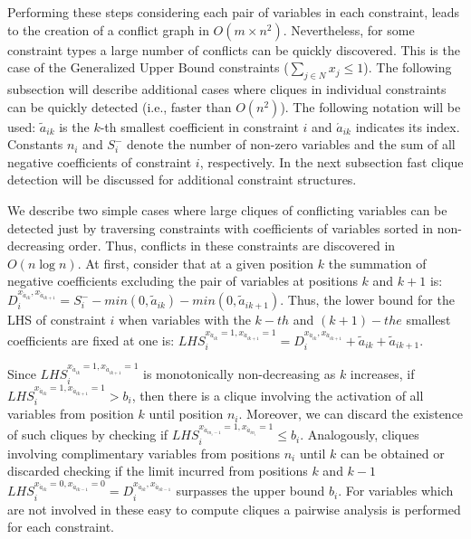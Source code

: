 \documentclass{endm}
\begin{document}
Performing these steps considering each pair of variables in each constraint, leads to the creation of a conflict graph in $O(m \times n^2)$.  Nevertheless, for some constraint types a large number of conflicts can be quickly discovered. This is the case of the Generalized Upper Bound constraints ($\sum_{j\in N}x_j \leq 1$). The following subsection will describe additional cases where cliques in individual constraints can be quickly detected (i.e., faster than $O(n^2)$). The following notation will be used: $\tilde{a}_{ik}$ is the $k$-th smallest coefficient in constraint $i$ and $\acute{a}_{ik}$ indicates its index. Constants $n_i$ and $S_i^-$ denote the number of non-zero variables and the sum of all negative coefficients of constraint $i$, respectively. In the next subsection fast clique detection will be discussed for additional constraint structures. 

We describe two simple cases where large cliques of conflicting variables can be detected just by traversing constraints with  coefficients of variables sorted in non-decreasing order. Thus, conflicts in these constraints are discovered in $O( n \log n)$. At first, consider that at a given position $k$ the summation of negative coefficients excluding the pair of variables at positions $k$ and $k+1$ is: $\displaystyle D_{i}^{x_{\acute{a}_{ik}}, x_{\acute{a}_{ik+1}}} = S_i^- - min(0, \tilde{a}_{ik}) - min(0, \tilde{a}_{ik+1})$.  Thus, the lower bound for the LHS of constraint $i$ when variables with the $k-th$ and $(k+1)-the$ smallest coefficients are fixed at one is: $\displaystyle LHS_{i}^{x_{\acute{a}_{ik}} = 1, x_{\acute{a}_{ik+1}} = 1} = D_{i}^{x_{\acute{a}_{ik}}, x_{\acute{a}_{ik+1}}} + \tilde{a}_{ik} + \tilde{a}_{ik+1}$.

Since $LHS_{i}^{x_{\acute{a}_{ik}} = 1, x_{\acute{a}_{ik+1}} = 1}$ is monotonically non-decreasing as $k$ increases, if $LHS_{i}^{x_{\acute{a}_{ik}} = 1, x_{\acute{a}_{ik+1}} = 1} > b_{i}$, then there is a clique involving the activation of all variables from position $k$ until position $n_i$. Moreover, we can discard the existence of such cliques by checking if $LHS_{i}^{x_{\acute{a}_{in_i-1}} = 1, x_{\acute{a}_{in_i}} = 1} \leq b_i$. Analogously, cliques involving complimentary variables from positions $n_i$ until $k$ can be obtained or discarded checking if the limit incurred from positions $k$ and $k-1$  $LHS_{i}^{x_{\acute{a}_{ik}} = 0, x_{\acute{a}_{ik-1}} = 0} = D_{i}^{x_{\acute{a}_{ik}}, x_{\acute{a}_{ik-1}}} $ surpasses the upper bound $b_i$. For variables which are not involved in these easy to compute cliques a pairwise analysis is performed for each constraint. 
\end{document}
